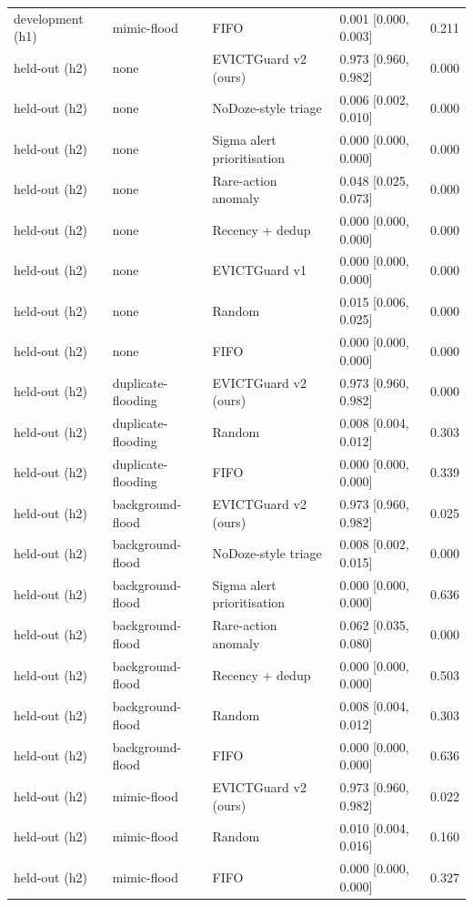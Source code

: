 \begin{tabular}{lllll}
development (h1) & mimic-flood & FIFO & 0.001 [0.000, 0.003] & 0.211 \\
held-out (h2) & none & EVICTGuard v2 (ours) & 0.973 [0.960, 0.982] & 0.000 \\
held-out (h2) & none & NoDoze-style triage & 0.006 [0.002, 0.010] & 0.000 \\
held-out (h2) & none & Sigma alert prioritisation & 0.000 [0.000, 0.000] & 0.000 \\
held-out (h2) & none & Rare-action anomaly & 0.048 [0.025, 0.073] & 0.000 \\
held-out (h2) & none & Recency + dedup & 0.000 [0.000, 0.000] & 0.000 \\
held-out (h2) & none & EVICTGuard v1 & 0.000 [0.000, 0.000] & 0.000 \\
held-out (h2) & none & Random & 0.015 [0.006, 0.025] & 0.000 \\
held-out (h2) & none & FIFO & 0.000 [0.000, 0.000] & 0.000 \\
held-out (h2) & duplicate-flooding & EVICTGuard v2 (ours) & 0.973 [0.960, 0.982] & 0.000 \\
held-out (h2) & duplicate-flooding & Random & 0.008 [0.004, 0.012] & 0.303 \\
held-out (h2) & duplicate-flooding & FIFO & 0.000 [0.000, 0.000] & 0.339 \\
held-out (h2) & background-flood & EVICTGuard v2 (ours) & 0.973 [0.960, 0.982] & 0.025 \\
held-out (h2) & background-flood & NoDoze-style triage & 0.008 [0.002, 0.015] & 0.000 \\
held-out (h2) & background-flood & Sigma alert prioritisation & 0.000 [0.000, 0.000] & 0.636 \\
held-out (h2) & background-flood & Rare-action anomaly & 0.062 [0.035, 0.080] & 0.000 \\
held-out (h2) & background-flood & Recency + dedup & 0.000 [0.000, 0.000] & 0.503 \\
held-out (h2) & background-flood & Random & 0.008 [0.004, 0.012] & 0.303 \\
held-out (h2) & background-flood & FIFO & 0.000 [0.000, 0.000] & 0.636 \\
held-out (h2) & mimic-flood & EVICTGuard v2 (ours) & 0.973 [0.960, 0.982] & 0.022 \\
held-out (h2) & mimic-flood & Random & 0.010 [0.004, 0.016] & 0.160 \\
held-out (h2) & mimic-flood & FIFO & 0.000 [0.000, 0.000] & 0.327 \\
\bottomrule
\end{tabular}
